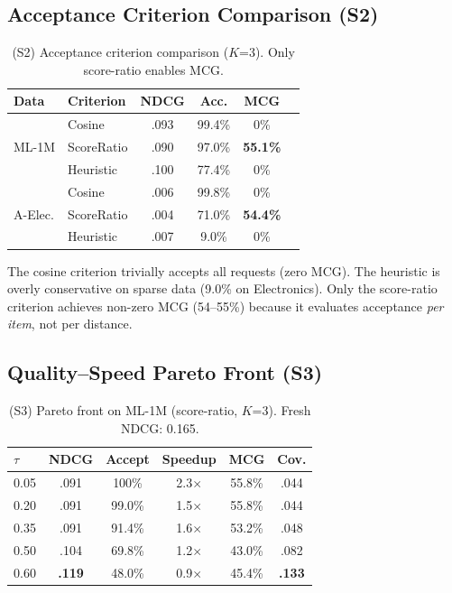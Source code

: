 \documentclass[sigconf,nonacm=false]{acmart}
\begin{document}
\subsection{Acceptance Criterion Comparison (S2)}
\label{sec:exp_s2}

\begin{table}[t]
\centering
\caption{(S2) Acceptance criterion comparison ($K$=3). Only score-ratio enables MCG.}
\label{tab:s2}
\small
\begin{tabular}{ll cccc}
\toprule
\textbf{Data} & \textbf{Criterion} & \textbf{NDCG} & \textbf{Acc.} & \textbf{MCG} \\
\midrule
\multirow{3}{*}{ML-1M}
& Cosine & .093 & 99.4\% & 0\% \\
& \cellcolor{gray!15} ScoreRatio & \cellcolor{gray!15} .090 & \cellcolor{gray!15} 97.0\% & \cellcolor{gray!15} \textbf{55.1\%} \\
& Heuristic & .100 & 77.4\% & 0\% \\
\midrule
\multirow{3}{*}{A-Elec.}
& Cosine & .006 & 99.8\% & 0\% \\
& \cellcolor{gray!15} ScoreRatio & \cellcolor{gray!15} .004 & \cellcolor{gray!15} 71.0\% & \cellcolor{gray!15} \textbf{54.4\%} \\
& Heuristic & .007 & 9.0\% & 0\% \\
\bottomrule
\end{tabular}
\end{table}

The cosine criterion trivially accepts all requests (zero MCG). The heuristic is overly conservative on sparse data (9.0\% on Electronics). Only the score-ratio criterion achieves non-zero MCG (54--55\%) because it evaluates acceptance \emph{per item}, not per distance.

\subsection{Quality--Speed Pareto Front (S3)}
\label{sec:exp_s3}

\begin{table}[t]
\centering
\caption{(S3) Pareto front on ML-1M (score-ratio, $K$=3). Fresh NDCG: 0.165.}
\label{tab:s3}
\small
\begin{tabular}{lccccc}
\toprule
$\tau$ & NDCG & Accept & Speedup & MCG & Cov. \\
\midrule
0.05 & .091 & 100\% & 2.3$\times$ & 55.8\% & .044 \\
0.20 & .091 & 99.0\% & 1.5$\times$ & 55.8\% & .044 \\
\rowcolor{gray!15}
0.35 & .091 & 91.4\% & 1.6$\times$ & 53.2\% & .048 \\
0.50 & .104 & 69.8\% & 1.2$\times$ & 43.0\% & .082 \\
0.60 & \textbf{.119} & 48.0\% & 0.9$\times$ & 45.4\% & \textbf{.133} \\
\bottomrule
\end{tabular}
\end{table}
\end{document}

